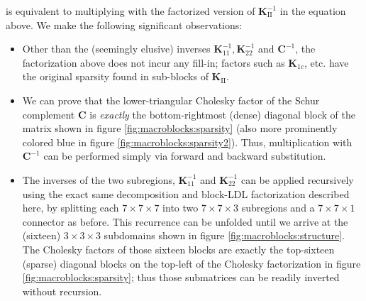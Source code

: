 is equivalent to multiplying with the factorized version of
$\mathbf{K}_{\textrm{II}}^{-1}$ in the equation above. We make the
following significant observations: \vspace{-.04in}
\begin{itemize}
\item Other than the (seemingly elusive) inverses
  $\mathbf{K}_{11}^{-1},\mathbf{K}_{22}^{-1}$ and $\mathbf{C}^{-1}$,
  the factorization above does not incur any fill-in; factors such as
  $\mathbf{K}_{1c}$, etc. have the original sparsity found in
  sub-blocks of $\mathbf{K}_{\textrm{II}}$.
\item We can prove that the lower-triangular Cholesky factor of the
  Schur complement $\mathbf{C}$ is \emph{exactly} the bottom-rightmost
  (dense) diagonal block of the matrix shown in figure
  \ref{fig:macroblocks:sparsity} (also more prominently colored blue in figure
  \ref{fig:macroblocks:sparsity2}). Thus, multiplication with $\mathbf{C}^{-1}$
  can be performed simply via forward and backward substitution.
\item The inverses of the two subregions, $\mathbf{K}_{11}^{-1}$ and
  $\mathbf{K}_{22}^{-1}$ can be applied recursively using the exact
  same decomposition and block-LDL factorization described here, by
  splitting each $7\times 7\times 7$ into two $7\times 7\times 3$
  subregions and a $7\times 7\times 1$ connector as before. This
  recurrence can be unfolded until we arrive at the (sixteen)
  $3\times 3\times 3$ subdomains shown in figure
  \ref{fig:macroblocks:structure}. The Cholesky factors of those sixteen blocks
  are exactly the top-sixteen (sparse) diagonal blocks on the top-left
  of the Cholesky factorization in figure \ref{fig:macroblocks:sparsity}; thus
  those submatrices can be readily inverted without recursion.
\end{itemize}

